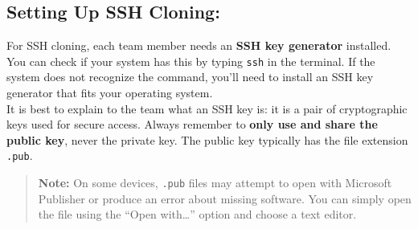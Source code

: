 \subsection*{Setting Up SSH Cloning:}
For SSH cloning, each team member needs an \textbf{SSH key generator} installed.
You can check if your system has this by typing \texttt{ssh} in the terminal.
If the system does not recognize the command, you’ll need to install an SSH key generator that fits your operating system. \\ \newline
It is best to explain to the team what an SSH key is: it is a pair of cryptographic keys used for secure access.
Always remember to \textbf{only use and share the public key}, never the private key.
The public key typically has the file extension \texttt{.pub}.

\begin{quote}
    \textbf{Note:} On some devices, \texttt{.pub} files may attempt to open with Microsoft Publisher or produce an error about missing software.
    You can simply open the file using the ``Open with\ldots'' option and choose a text editor.
\end{quote}

